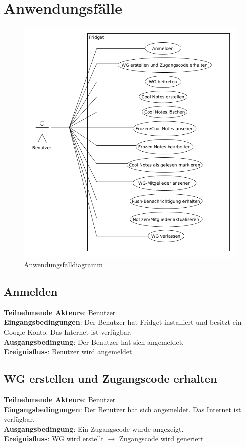 \documentclass[a4paper]{scrreprt}
\begin{document}
        \section{Anwendungsfälle}
        	\begin{figure}[h]
        		\centering
        		\includegraphics[scale = .6]{anwendungsfalldiagramm.png}
        		\caption{Anwendungsfalldiagramm}
        	\end{figure}
        	
        	\subsection{Anmelden}
        	\textbf{Teilnehmende Akteure}: Benutzer \\
        	\textbf{Eingangsbedingungen}: Der Benutzer hat Fridget installiert und besitzt ein Google-Konto. Das Internet ist verfügbar. \\
        	\textbf{Ausgangsbedingung}: Der Benutzer hat sich angemeldet. \\
        	\textbf{Ereignisfluss}: Benutzer wird angemeldet
        	
        	\subsection{WG erstellen und Zugangscode erhalten}
        	\textbf{Teilnehmende Akteure}: Benutzer \\
        	\textbf{Eingangsbedingungen}: Der Benutzer hat sich angemeldet. Das Internet ist verfügbar. \\
        	\textbf{Ausgangsbedingung}: Ein Zugangscode wurde angezeigt. \\
        	\textbf{Ereignisfluss}: WG wird erstellt $\rightarrow$ Zugangscode wird generiert
        	
\end{document}

